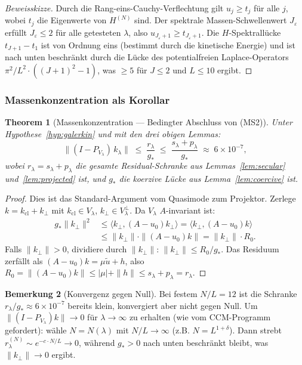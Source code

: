 \documentclass[11pt,a4paper]{article}
\theoremstyle{plain}
\newtheorem{theorem}{Theorem}[section]
\theoremstyle{definition}
\newtheorem{remark}[theorem]{Bemerkung}
\begin{document}
\begin{proof}[Beweisskizze]
Durch die Rang-eins-Cauchy-Verflechtung gilt $u_j \geq t_j$ für alle $j$,
wobei $t_j$ die Eigenwerte von $H^{(N)}$ sind. Der spektrale
Massen-Schwellenwert $J_\varepsilon$ erfüllt $J_\varepsilon \leq 2$ für alle
getesteten $\lambda$, also $u_{J_\varepsilon+1} \geq t_{J_\varepsilon+1}$.
Die $H$-Spektrallücke $t_{J+1} - t_1$ ist von Ordnung eins (bestimmt durch
die kinetische Energie) und ist nach unten beschränkt durch die Lücke des
potentialfreien Laplace-Operators $\pi^2/L^2 \cdot ((J+1)^2 - 1)$, was $\geq 5$
für $J \leq 2$ und $L \leq 10$ ergibt.
\end{proof}

\subsubsection{Massenkonzentration als Korollar}

\begin{theorem}[Massenkonzentration --- Bedingter Abschluss von (MS2)]
\label{thm:mass-concentration}
Unter Hypothese~\ref{hyp:galerkin} und mit den drei obigen Lemmas:
\[
  \|(I - P_{V_\lambda})\, k_\lambda\|
  \;\leq\; \frac{r_\lambda}{g_*}
  \;\leq\; \frac{s_\lambda + p_\lambda}{g_*}
  \;\approx\; 6 \times 10^{-7},
\]
wobei $r_\lambda = s_\lambda + p_\lambda$ die gesamte Residual-Schranke
aus Lemmas~\ref{lem:secular} und~\ref{lem:projected} ist, und
$g_*$ die koerzive Lücke aus Lemma~\ref{lem:coercive} ist.
\end{theorem}

\begin{proof}
Dies ist das Standard-Argument vom Quasimode zum Projektor. Zerlege
$k = k_{\mathrm{cl}} + k_\perp$ mit $k_{\mathrm{cl}} \in V_\lambda$,
$k_\perp \in V_\lambda^\perp$. Da $V_\lambda$ $A$-invariant ist:
\begin{align*}
  g_* \|k_\perp\|^2
  &\leq \langle k_\perp, (A-u_0) k_\perp \rangle
  = \langle k_\perp, (A-u_0) k \rangle \\
  &\leq \|k_\perp\| \cdot \|(A-u_0)k\|
  = \|k_\perp\| \cdot R_0.
\end{align*}
Falls $\|k_\perp\| > 0$, dividiere durch $\|k_\perp\|$:
$\|k_\perp\| \leq R_0/g_*$. Das Residuum zerfällt als
$(A-u_0)k = \mu\tilde{u} + h$, also
$R_0 = \|(A-u_0)k\| \leq |\mu| + \|h\| \leq s_\lambda + p_\lambda
= r_\lambda$.
\end{proof}

\begin{remark}[Konvergenz gegen Null]
Bei festem $N/L = 12$ ist die Schranke $r_\lambda/g_* \approx 6 \times
10^{-7}$ bereits klein, konvergiert aber nicht gegen Null. Um
$\|(I-P_{V_\lambda})k\| \to 0$ für $\lambda \to \infty$ zu erhalten (wie
vom CCM-Programm gefordert): wähle $N = N(\lambda)$ mit $N/L \to \infty$
(z.B. $N = L^{1+\delta}$). Dann strebt $r_\lambda^{(N)} \sim
e^{-c \cdot N/L} \to 0$, während $g_* > 0$ nach unten beschränkt bleibt,
was $\|k_\perp\| \to 0$ ergibt.
\end{remark}
\end{document}
